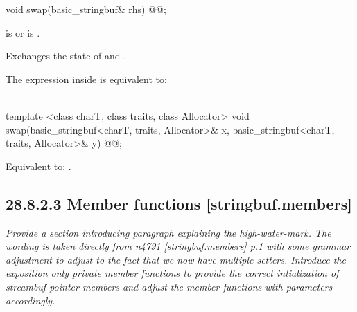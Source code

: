 \documentclass[ebook,11pt,article]{memoir}
\begin{document}
%
\begin{itemdecl}
void swap(basic_stringbuf& rhs) @@;
\end{itemdecl}

\begin{itemdescr}
\begin{addedblock}
\pnum
\expects {} is  or  is .
\end{addedblock}

\pnum
\effects Exchanges the state of 
and . 

\begin{addedblock}
\pnum
\remarks The expression inside  is equivalent to: \\
\\
\end{addedblock}
\end{itemdescr}

%
\begin{itemdecl}
template <class charT, class traits, class Allocator>
  void swap(basic_stringbuf<charT, traits, Allocator>& x,
            basic_stringbuf<charT, traits, Allocator>& y) @@;
\end{itemdecl}

\begin{itemdescr}
\pnum
\effects Equivalent to: .
\end{itemdescr}


\subsection{28.8.2.3 Member functions [stringbuf.members]}

\textit{Provide a section introducing paragraph explaining the high-water-mark. The wording is taken directly from n4791 [stringbuf.members] p.1 with some grammar adjustment to adjust to the fact that we now have multiple setters. Introduce the exposition only private member functions  to provide the correct intialization of streambuf pointer members and adjust the  member functions with parameters accordingly. }
\end{document}
